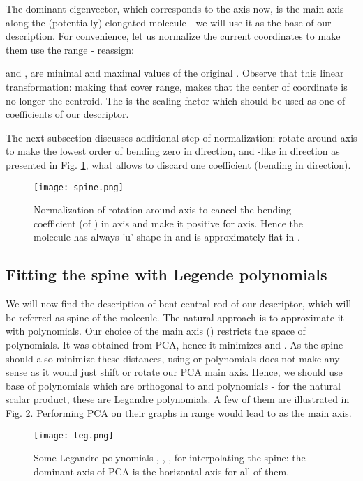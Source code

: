\documentclass[10pt,journal]{IEEEtranTCOM}
\theoremstyle{plain}
\begin{document}
The dominant eigenvector, which corresponds to the  axis now, is the main axis along the (potentially) elongated molecule - we will use it as the base of our description. For convenience, let us normalize the  current coordinates to make them use the  range - reassign:

and ,  are minimal and maximal values of the original . Observe that this linear transformation: making that  cover  range, makes that the center of coordinate is no longer the centroid. The  is the scaling factor which should be used as one of coefficients of our descriptor.

The next subsection discusses additional step of normalization: rotate around  axis to make the lowest order of bending zero in  direction, and -like in  direction as presented in Fig. \ref{spine}, what allows to discard one coefficient (bending in  direction).

\begin{figure}[t!]
    \centering
        \texttt{[image: spine.png]}
        \caption{Normalization of rotation around  axis to cancel the bending coefficient (of ) in  axis and make it positive for  axis. Hence the molecule has always 'u'-shape in  and is approximately flat in .}
        \label{spine}
\end{figure}

\subsection{Fitting the spine with Legende polynomials}
We will now find the description of bent central rod of our descriptor, which will be referred as spine of the molecule.
The natural approach is to approximate it with polynomials. Our choice of the main axis () restricts the space of polynomials. It was obtained from PCA, hence it minimizes  and . As the spine should also minimize these distances, using  or  polynomials does not make any sense as it would just shift or rotate our PCA main axis. Hence, we should use base of polynomials which are orthogonal to  and  polynomials - for the natural  scalar product, these are Legandre polynomials. A few of them are illustrated in Fig. \ref{leg}. Performing PCA on their graphs in  range would lead to  as the main axis.

\begin{figure}[t!]
    \centering
        \texttt{[image: leg.png]}
        \caption{Some Legandre polynomials , , ,  for interpolating the spine: the dominant axis of PCA is the horizontal  axis for all of them.}
        \label{leg}
\end{figure}
\end{document}
